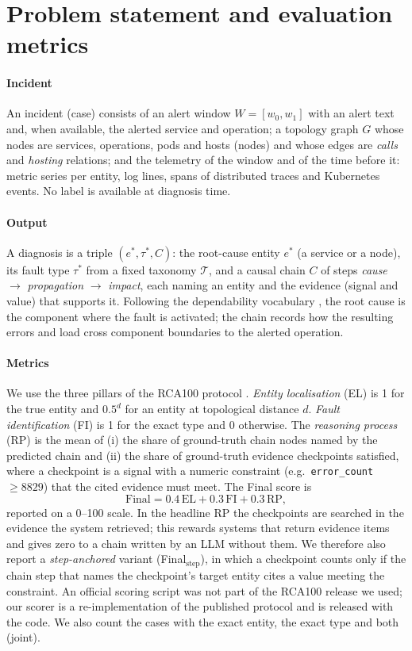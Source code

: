 \section{Problem statement and evaluation metrics}\label{sec:problem}

\paragraph{Incident}
An incident (case) consists of an alert window $W=[w_0,w_1]$ with an alert text and, when available, the alerted service and
operation; a topology graph $G$ whose nodes are services, operations, pods and hosts (nodes) and whose edges are \emph{calls} and
\emph{hosting} relations; and the telemetry of the window and of the time before it: metric series per entity, log lines, spans of
distributed traces and Kubernetes events. No label is available at diagnosis time.

\paragraph{Output}
A diagnosis is a triple $(e^\ast,\tau^\ast,C)$: the root-cause entity $e^\ast$ (a service or a node), its fault type $\tau^\ast$ from a
fixed taxonomy $\mathcal{T}$, and a causal chain $C$ of steps \emph{cause} $\rightarrow$ \emph{propagation} $\rightarrow$
\emph{impact}, each naming an entity and the evidence (signal and value) that supports it. Following the dependability vocabulary
\citep{avizienis2004taxonomy}, the root cause is the component where the fault is activated; the chain records how the resulting
errors and load cross component boundaries to the alerted operation.

\paragraph{Metrics}
We use the three pillars of the RCA100 protocol \citep{cai2026benchmark}. \emph{Entity localisation} (EL) is 1 for the true entity
and $0.5^d$ for an entity at topological distance $d$. \emph{Fault identification} (FI) is 1 for the exact type and 0 otherwise.
The \emph{reasoning process} (RP) is the mean of (i) the share of ground-truth chain nodes named by the predicted chain and (ii) the
share of ground-truth evidence checkpoints satisfied, where a checkpoint is a signal with a numeric constraint (e.g.\
\texttt{error\_count} $\geq 8829$) that the cited evidence must meet. The Final score is
\begin{equation}
\text{Final} = 0.4\,\text{EL} + 0.3\,\text{FI} + 0.3\,\text{RP},
\end{equation}
reported on a 0--100 scale. In the headline RP the checkpoints are searched in the evidence the system retrieved; this rewards
systems that return evidence items and gives zero to a chain written by an LLM without them. We therefore also report a
\emph{step-anchored} variant (Final$_\text{step}$), in which a checkpoint counts only if the chain step that names the
checkpoint's target entity cites a value meeting the constraint. An official scoring script was not part of the RCA100 release we used;
our scorer is a re-implementation of the published protocol and is released with the code. We also count the cases with the exact
entity, the exact type and both (joint).
